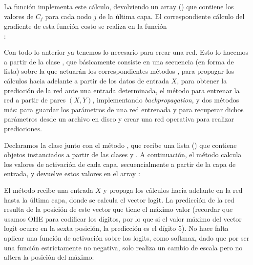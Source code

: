 La función  implementa este cálculo, devolviendo un array () que contiene los valores de $C_j$ para cada nodo $j$ de la última capa. El correspondiente cálculo del gradiente de esta función costo se realiza en la función\\ :


Con todo lo anterior ya tenemos lo necesario para crear una red. Esto lo hacemos a partir de la clase , que básicamente consiste en una secuencia (en forma de lista) sobre la que actuarán los correspondientes métodos , para propagar los cálculos hacia adelante a partir de los datos de entrada $X$,  para obtener la predicción de la red ante una entrada determinada, el método  para entrenar la red a partir de pares $(X, Y)$, implementando \textit{backpropagation}, y dos métodos más:  para guardar los parámetros de una red entrenada y  para recuperar dichos parámetros desde un archivo en disco y crear una red operativa para realizar predicciones.

Declaramos la clase  junto con el método , que recibe una lista () que contiene objetos instanciados a partir de las clases  y . A continuación, el método  calcula los valores de activación de cada capa, secuencialmente a partir de la capa de entrada, y devuelve estos valores en el array :


El método  recibe una entrada $X$ y propaga los cálculos hacia adelante en la red hasta la última capa, donde se calcula el vector logit. La predicción de la red resulta de la posición de este vector que tiene el máximo valor (recordar que usamos OHE para codificar los dígitos, por lo que si el valor máximo del vector logit ocurre en la sexta posición, la predicción es el dígito 5). No hace falta aplicar una función de activación sobre los logits, como softmax, dado que por ser una función estrictamente no negativa, solo realiza un cambio de escala pero no altera la posición del máximo:


